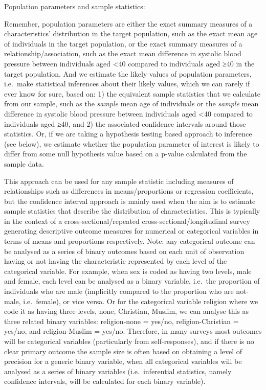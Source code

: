 \documentclass[
]{book}
\begin{document}
Population parameters and sample statistics:

Remember, population parameters are either the exact summary measures of a characteristics' distribution in the target population, such as the exact mean age of individuals in the target population, or the exact summary measures of a relationship/association, such as the exact mean difference in systolic blood pressure between individuals aged \textless40 compared to individuals aged ≥40 in the target population. And we estimate the likely values of population parameters, i.e.~make statistical inferences about their likely values, which we can rarely if ever know for sure, based on: 1) the equivalent sample statistics that we calculate from our sample, such as the \emph{sample} mean age of individuals or the \emph{sample} mean difference in systolic blood pressure between individuals aged \textless40 compared to individuals aged ≥40, and 2) the associated confidence intervals around those statistics. Or, if we are taking a hypothesis testing based approach to inference (see below), we estimate whether the population parameter of interest is likely to differ from some null hypothesis value based on a p-value calculated from the sample data.

This approach can be used for any sample statistic including measures of relationships such as differences in means/proportions or regression coefficients, but the confidence interval approach is mainly used when the aim is to estimate sample statistics that describe the distribution of characteristics. This is typically in the context of a cross-sectional/repeated cross-sectional/longitudinal survey generating descriptive outcome measures for numerical or categorical variables in terms of means and proportions respectively. Note: any categorical outcome can be analysed as a series of binary outcomes based on each unit of observation having or not having the characteristic represented by each level of the categorical variable. For example, when sex is coded as having two levels, male and female, each level can be analysed as a binary variable, i.e.~the proportion of individuals who are male (implicitly compared to the proportion who are not-male, i.e.~female), or vice versa. Or for the categorical variable religion where we code it as having three levels, none, Christian, Muslim, we can analyse this as three related binary variables: religion-none = yes/no, religion-Christian = yes/no, and religion-Muslim = yes/no. Therefore, in many surveys most outcomes will be categorical variables (particularly from self-responses), and if there is no clear primary outcome the sample size is often based on obtaining a level of precision for a generic binary variable, when all categorical variables will be analysed as a series of binary variables (i.e.~inferential statistics, namely confidence intervals, will be calculated for each binary variable).
\end{document}
